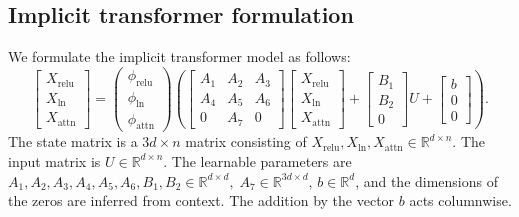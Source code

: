 \documentclass{article}
\begin{document}
\subsection{Implicit transformer formulation}
We formulate the implicit transformer model as follows:
\begin{equation}
  \label{eq:impt1}
  \begin{bmatrix} X_\text{relu} \\ X_\text{ln} \\ X_\text{attn}\end{bmatrix} = 
  \begin{pmatrix} \phi_\text{relu} \\ \phi_\text{ln} \\ \phi_\text{attn}
  \end{pmatrix}\left(
  \begin{bmatrix} A_1 & A_2 & A_3 \\ A_4 & A_5 & A_6 \\ 0 & A_7 & 0
  \end{bmatrix}\begin{bmatrix} X_\text{relu} \\ X_\text{ln} \\ X_\text{attn}
  \end{bmatrix} + \begin{bmatrix} B_1 \\ B_2 \\ 0\end{bmatrix} U + 
    \begin{bmatrix} b \\ 0 \\ 0 \end{bmatrix}\right).
\end{equation}
The state matrix is a $3d\times n$ matrix consisting of
$X_\text{relu}, X_\text{ln}, X_\text{attn} \in \mathbb R^{d\times n}.$ The 
input matrix is $U\in\mathbb R^{d\times n}$. The learnable parameters are 
$A_1, A_2, A_3, A_4, A_5, A_6, B_1, B_2 \in\mathbb R^{d\times d},\; A_7\in
\mathbb R^{3d\times d},\, b\in\mathbb R^d$, and the dimensions of the zeros 
are inferred from context. The addition by the vector $b$ acts columnwise.
\end{document}
